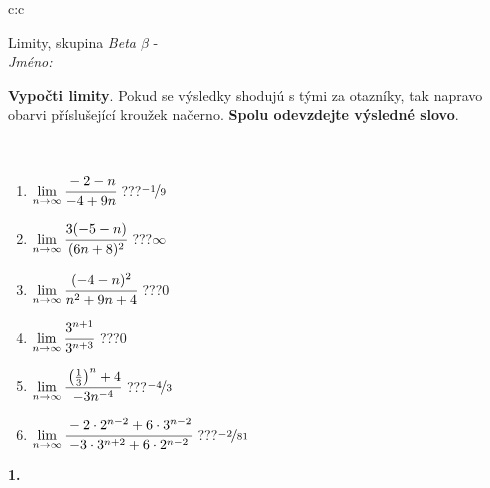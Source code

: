 \documentclass[10pt]{report}
\begin{document}
\begin{tabular}{c:c}
\begin{minipage}[c][104.5mm][t]{0.5\linewidth}
\begin{center}
\vspace{7mm}
{\huge Limity, skupina \textit{Beta $\beta$} -}\\[5mm]
\textit{Jméno:}\phantom{xxxxxxxxxxxxxxxxxxxxxxxxxxxxxxxxxxxxxxxxxxxxxxxxxxxxxxxxxxxxxxxxx}\\[5mm]
\begin{minipage}{0.95\linewidth}
\begin{center}
\textbf{Vypočti limity}. Pokud se výsledky shodujú s tými za otazníky, tak napravo\\obarvi příslušející kroužek načerno. \textbf{Spolu odevzdejte výsledné slovo}.
\end{center}
\end{minipage}
\\[1mm]
\begin{minipage}{0.79\linewidth}
\begin{center}
\begin{varwidth}{\linewidth}
\begin{enumerate}
\normalsize
\item $\lim\limits_{n\to\infty}\cfrac{-2-n}{-4+9n}$\quad \dotfill\; ???\;\dotfill \quad $\nicefrac{-1}{9}$
\item $\lim\limits_{n\to\infty}\cfrac{3(-5-n)}{(6n+8)^2}$\quad \dotfill\; ???\;\dotfill \quad $\infty$
\item $\lim\limits_{n\to\infty}\cfrac{(-4-n)^2}{n^2+9n+4}$\quad \dotfill\; ???\;\dotfill \quad $0$
\item $\lim\limits_{n\to\infty}\cfrac{3^{n+1}}{3^{n+3}}$\quad \dotfill\; ???\;\dotfill \quad $0$
\item $\lim\limits_{n\to\infty}\cfrac{\left(\frac{1}{3}\right)^n +4}{-3n^{-4}}$\quad \dotfill\; ???\;\dotfill \quad $\nicefrac{-4}{3}$
\item $\lim\limits_{n\to\infty}\cfrac{-2\cdot 2^{n-2}+6\cdot 3^{n-2}}{-3\cdot 3^{n+2}+6\cdot 2^{n-2}}$\quad \dotfill\; ???\;\dotfill \quad $\nicefrac{-2}{81}$
\end{enumerate}
\end{varwidth}
\end{center}
\end{minipage}
\begin{minipage}{0.20\linewidth}
\begin{center}
{\Huge\bfseries 1.} \\[2mm]

\end{center}
\end{minipage}
\end{center}
\end{minipage}
\end{tabular}
\end{document}
